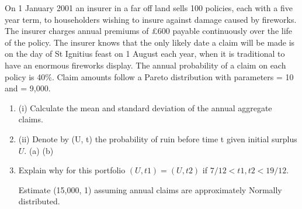 \documentclass[a4paper,12pt]{article}
\begin{document}

On 1 January 2001 an insurer in a far off land sells 100 policies, each with a five year
term, to householders wishing to insure against damage caused by fireworks. The
insurer charges annual premiums of £600 payable continuously over the life of the
policy.
The insurer knows that the only likely date a claim will be made is on the day of
St Ignitius feast on 1 August each year, when it is traditional to have an enormous
fireworks display. The annual probability of a claim on each policy is 40\%. Claim
amounts follow a Pareto distribution with parameters = 10 and = 9,000.
\begin{enumerate}
\item (i) Calculate the mean and standard deviation of the annual aggregate claims. 
\item (ii) Denote by (U, t) the probability of ruin before time t given initial surplus $U$.
(a)
(b)
\item 
Explain why for this portfolio $(U, t 1 ) = (U, t 2 )$ if
$7/12 < t 1 , t 2 < 19/12$.

Estimate (15,000, 1) assuming annual claims are approximately
Normally distributed.
\end{enumerate}
\end{document}
